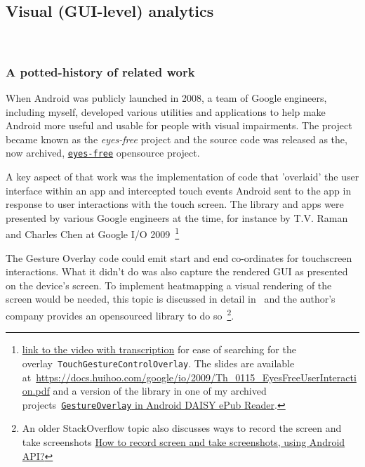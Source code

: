 \subsection{Visual (GUI-level) analytics}~\label{section-visual-gui-analytics}

\subsubsection{A potted-history of related work}
When Android was publicly launched in 2008, a team of Google engineers, including myself, developed various utilities and applications to help make Android more useful and usable for people with visual impairments. The project became known as the \emph{eyes-free} project and the source code was released as the, now archived, \href{https://code.google.com/archive/p/eyes-free/}{\texttt{eyes-free}} opensource project. 

A key aspect of that work was the implementation of code that 'overlaid' the user interface within an app and intercepted touch events Android sent to the app in response to user interactions with the touch screen. The library and apps were presented by various Google engineers at the time, for instance by T.V. Raman and Charles Chen at Google I/O 2009~\footnote{ \href{http://transcriptvids.com/v/xS-ju61vOQw.html}{link to the video with transcription} for ease of searching for the overlay~\texttt{TouchGestureControlOverlay}. The slides are available at~\url{https://docs.huihoo.com/google/io/2009/Th_0115_EyesFreeUserInteraction.pdf} and a version of the library in one of my archived projects~\href{https://github.com/julianharty/android-daisy-epub-reader/blob/master/src/com/google/marvin/widget/GestureOverlay.java}{\texttt{GestureOverlay} in Android DAISY ePub Reader}.} 

The Gesture Overlay code could emit start and end co-ordinates for touchscreen interactions. What it didn't do was also capture the rendered GUI as presented on the device's screen. To implement heatmapping a visual rendering of the screen would be needed, this topic is discussed in detail in~\citep{bolt2019_how_to_programmatically_capture_screen_on_android} and the author's company provides an opensourced library to do so~\footnote{An older StackOverflow topic also discusses ways to record the screen and take screenshots \href{https://stackoverflow.com/questions/32513379/how-to-record-screen-and-take-screenshots-using-android-api}{How to record screen and take screenshots, using Android API?}}. 

